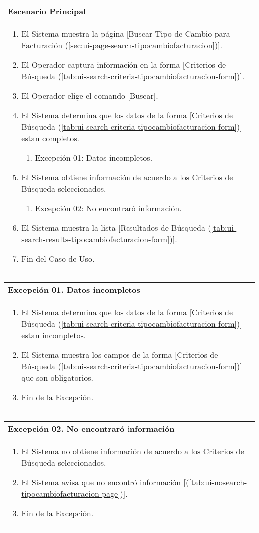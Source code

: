 \begin{tabular}{ p{15.5cm} }
	\textbf{Escenario Principal} \\
	\begin{enumerate}
		\item El Sistema muestra la página [Buscar Tipo de Cambio para Facturación (\ref{sec:ui-page-search-tipocambiofacturacion})].
		\item El Operador captura información en la forma [Criterios de Búsqueda (\ref{tab:ui-search-criteria-tipocambiofacturacion-form})].
		\item El Operador elige el comando [Buscar].
		\item El Sistema determina que los datos de la forma [Criterios de Búsqueda (\ref{tab:ui-search-criteria-tipocambiofacturacion-form})] estan completos.
			\begin{enumerate}
				\item Excepción 01: Datos incompletos.
			\end{enumerate}
		\item El Sistema obtiene información de acuerdo a los Criterios de Búsqueda seleccionados.
			\begin{enumerate}
				\item Excepción 02: No encontraró información.
			\end{enumerate}
		\item El Sistema muestra la lista [Resultados de Búsqueda (\ref{tab:ui-search-results-tipocambiofacturacion-form})].
		\item Fin del Caso de Uso.
	\end{enumerate}
\end{tabular}

\begin{tabular}{ p{15.5cm} }
	\textbf{Excepción 01. Datos incompletos} \\
	\begin{enumerate}
		\item El Sistema determina que los datos de la forma [Criterios de Búsqueda (\ref{tab:ui-search-criteria-tipocambiofacturacion-form})] estan incompletos.
		\item El Sistema muestra los campos de la forma [Criterios de Búsqueda (\ref{tab:ui-search-criteria-tipocambiofacturacion-form})] que son obligatorios.
		\item Fin de la Excepción.
	\end{enumerate}
\end{tabular}

\begin{tabular}{ p{15.5cm} }
	\textbf{Excepción 02. No encontraró información} \\
	\begin{enumerate}
		\item El Sistema no obtiene información de acuerdo a los Criterios de Búsqueda seleccionados.
		\item El Sistema avisa que no encontró información [(\ref{tab:ui-nosearch-tipocambiofacturacion-page})].
		\item Fin de la Excepción.
	\end{enumerate}
\end{tabular}


